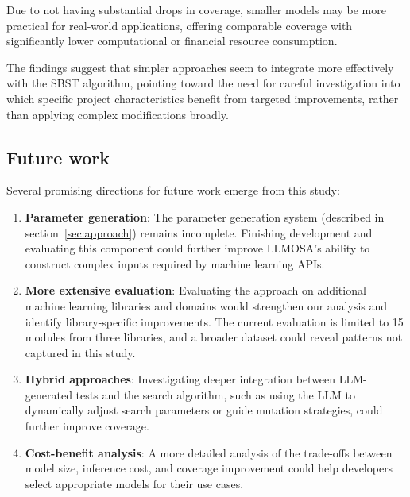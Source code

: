 \documentclass{article}
\newif\ifdetails
\begin{document}
Due to not having substantial drops in coverage, smaller models may be more practical for real-world applications, offering comparable coverage with significantly  lower computational or financial resource consumption.

The findings suggest that simpler approaches seem to integrate more effectively with the SBST algorithm, pointing toward the need for careful investigation into which specific project characteristics benefit from targeted improvements, rather than applying complex modifications broadly.

\subsection{Future work}

Several promising directions for future work emerge from this study:

\begin{enumerate}
    \item \textbf{Parameter generation}: The parameter generation system (described in section~\ref{sec:approach}) remains incomplete. Finishing development and evaluating this component could further improve LLMOSA's ability to construct complex inputs required by machine learning APIs.

    \item \textbf{More extensive evaluation}: Evaluating the approach on additional machine learning libraries and domains would strengthen our analysis and identify library-specific improvements. The current evaluation is limited to 15 modules from three libraries, and a broader dataset could reveal patterns not captured in this study.

    \item \textbf{Hybrid approaches}: Investigating deeper integration between LLM-generated tests and the search algorithm, such as using the LLM to dynamically adjust search parameters or guide mutation strategies, could further improve coverage.

    \item \textbf{Cost-benefit analysis}: A more detailed analysis of the trade-offs between model size, inference cost, and coverage improvement could help developers select appropriate models for their use cases.
\end{enumerate}


\ifdetails
\end{document}
